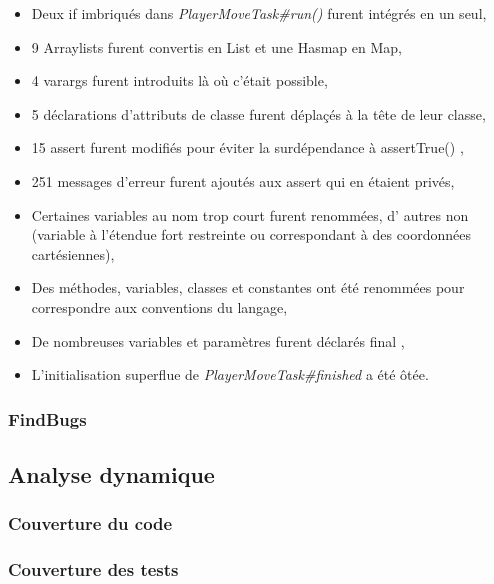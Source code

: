 \documentclass[12pt, openany]{report}
\begin{document}
\begin{itemize}
	\item Deux \og if \fg{} imbriqués dans \mbox{\textit{PlayerMoveTask\#run()}} furent intégrés en un seul,
	\item 9 Arraylists furent convertis en List et une Hasmap en Map,
	\item 4 \og varargs \fg{} furent introduits là où c'était possible,
	\item 5 déclarations d'attributs de classe furent déplaçés à la tête de leur classe,
	\item 15 \og assert \fg{} furent modifiés pour éviter la surdépendance à \og assertTrue() \fg{},
	\item 251 messages d'erreur furent ajoutés aux \og assert \fg{} qui en étaient privés,
	\item Certaines variables au nom trop court furent renommées, d' autres non (variable à l'étendue fort restreinte ou correspondant à des coordonnées cartésiennes),
	\item Des méthodes, variables, classes et constantes ont été renommées pour correspondre aux conventions du langage,
	\item De nombreuses variables et paramètres furent déclarés \og final \fg{},
	\item L'initialisation superflue de \mbox{\textit{PlayerMoveTask\#finished}} a été ôtée.
\end{itemize}

\subsubsection*{FindBugs}
\subsection{Analyse dynamique}


\subsubsection{Couverture du code}
\subsubsection{Couverture des tests}
\end{document}
